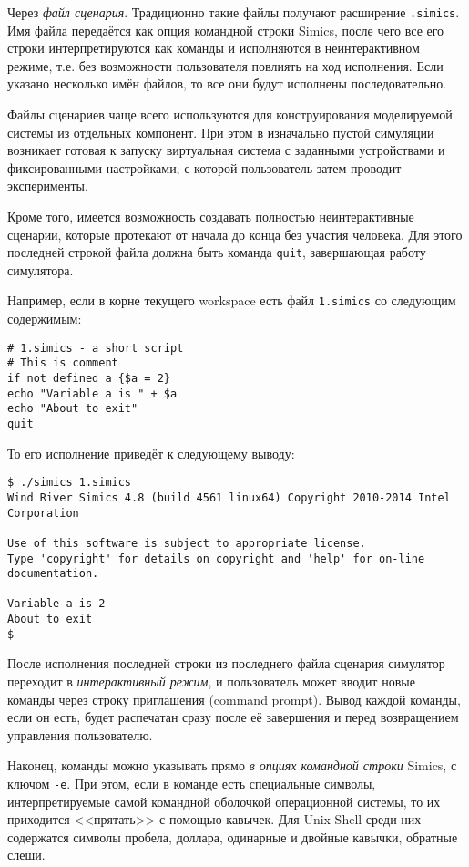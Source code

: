 \begin{enumerate*}
\item Через \textit{файл сценария}. Традиционно такие файлы получают расширение \texttt{.simics}. Имя файла передаётся как опция командной строки Simics, после чего все его строки интерпретируются как команды и исполняются в неинтерактивном режиме, т.е. без возможности пользователя повлиять на ход исполнения. Если указано несколько имён файлов, то все они будут исполнены последовательно.

Файлы сценариев чаще всего используются для конструирования моделируемой системы из отдельных компонент. При этом в изначально пустой симуляции возникает готовая к запуску виртуальная система с заданными устройствами и фиксированными настройками, с которой пользователь затем проводит эксперименты.

Кроме того, имеется возможность создавать полностью неинтерактивные сценарии, которые протекают от начала до конца без участия человека. Для этого последней строкой файла должна быть команда \texttt{quit}, завершающая работу симулятора.

Например, если в корне текущего workspace есть файл \texttt{1.simics} со следующим содержимым:
\begin{lstlisting}
# 1.simics - a short script
# This is comment
if not defined a {$a = 2}
echo "Variable a is " + $a
echo "About to exit"
quit
\end{lstlisting}

То его исполнение приведёт к следующему выводу:
\begin{lstlisting}
$ ./simics 1.simics
Wind River Simics 4.8 (build 4561 linux64) Copyright 2010-2014 Intel Corporation

Use of this software is subject to appropriate license.
Type 'copyright' for details on copyright and 'help' for on-line documentation.

Variable a is 2
About to exit
$ 
\end{lstlisting}

\item  После исполнения последней строки из последнего файла сценария симулятор переходит в \textit{интерактивный режим}, и пользователь может вводит новые команды через строку приглашения (\abbr command prompt). Вывод каждой команды, если он есть, будет распечатан сразу после её завершения и перед возвращением управления пользователю.

\item Наконец, команды можно указывать прямо \textit{в опциях командной строки} Simics, с ключом \texttt{-e}. При этом, если в команде есть специальные символы, интерпретируемые самой командной оболочкой операционной системы, то их приходится <<прятать>> с помощью кавычек. Для Unix Shell среди них содержатся символы пробела, доллара, одинарные и двойные кавычки, обратные слеши.

\todo

\end{enumerate*}

